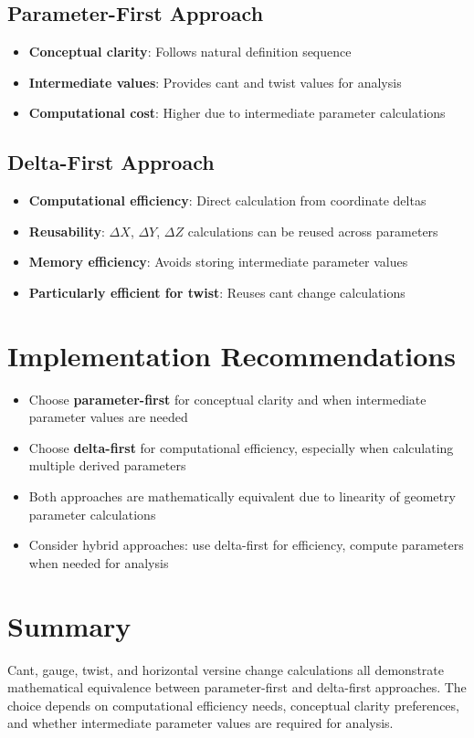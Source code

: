\documentclass{article}
\begin{document}
\subsection{Parameter-First Approach}
\begin{itemize}
\item \textbf{Conceptual clarity}: Follows natural definition sequence
\item \textbf{Intermediate values}: Provides cant and twist values for analysis
\item \textbf{Computational cost}: Higher due to intermediate parameter calculations
\end{itemize}

\subsection{Delta-First Approach}
\begin{itemize}
\item \textbf{Computational efficiency}: Direct calculation from coordinate deltas
\item \textbf{Reusability}: $\Delta X$, $\Delta Y$, $\Delta Z$ calculations can be reused across parameters
\item \textbf{Memory efficiency}: Avoids storing intermediate parameter values
\item \textbf{Particularly efficient for twist}: Reuses cant change calculations
\end{itemize}

\section{Implementation Recommendations}
\begin{itemize}
\item Choose \textbf{parameter-first} for conceptual clarity and when intermediate parameter values are needed
\item Choose \textbf{delta-first} for computational efficiency, especially when calculating multiple derived parameters
\item Both approaches are mathematically equivalent due to linearity of geometry parameter calculations
\item Consider hybrid approaches: use delta-first for efficiency, compute parameters when needed for analysis
\end{itemize}

\section{Summary}
Cant, gauge, twist, and horizontal versine change calculations all demonstrate mathematical equivalence between parameter-first and delta-first approaches. The choice depends on computational efficiency needs, conceptual clarity preferences, and whether intermediate parameter values are required for analysis.
\end{document}
